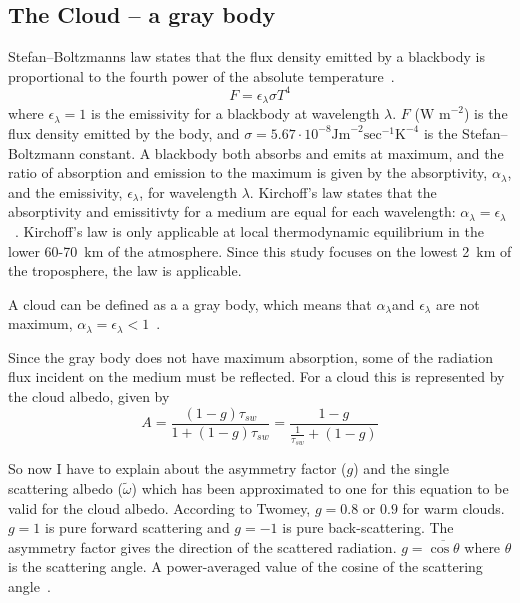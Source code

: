\subsection{The Cloud -- a gray body}
Stefan–Boltzmanns law states that the flux density emitted by a blackbody is proportional to the fourth power of the absolute temperature~\citep{Liou2002}. 
\begin{equation}
F = \epsilon_{\lambda} \sigma T^4
\label{eqn:stefanboltzmann}
\end{equation}
where $\epsilon_{\lambda} = 1$ is the emissivity for a blackbody at wavelength $\lambda$. $F$ ($\text{W~m}^{-2}$) is the flux density emitted  by the body, and $\sigma = 5.67\cdot 10^{-8} \text{Jm}^{-2}\text{sec}^{-1}\text{K}^{-4}$ is the Stefan–Boltzmann constant. A blackbody both absorbs and emits at maximum, and the ratio of absorption and emission to the maximum is given by the absorptivity, $\alpha_{\lambda}$, and the emissivity, $\epsilon_{\lambda}$, for wavelength $\lambda$. Kirchoff's law states that the absorptivity and emissitivty for a medium are equal for each wavelength: $\alpha_{\lambda} = \epsilon_{\lambda}$~\citep{Liou2002}. Kirchoff's law is only applicable at local thermodynamic equilibrium in the lower 60-70~km of the atmosphere. Since this study focuses on the lowest 2~km of the troposphere, the law is applicable.

A cloud can be defined as a a gray body, which means that $\alpha_{\lambda}$and $\epsilon_{\lambda}$ are not maximum, $\alpha_{\lambda}=\epsilon_{\lambda}<1$~\citep{Liou2002}. 

Since the gray body does not have maximum absorption, some of the radiation flux incident on the medium must be reflected. For a cloud this is represented by the cloud albedo, given by~\citep{Hobbs1993}
\begin{equation}
A = \frac{(1-g)\tau_{sw}}{1+(1-g)\tau_{sw}} = \frac{1-g}{\frac{1}{\tau_{sw}}+(1-g)}
\label{eqn:cloudalbedo_theory}
\end{equation}

So now I have to explain about the asymmetry factor ($g$) and the single scattering albedo ($\tilde{\omega}$) which has been approximated to one for this equation to be valid for the cloud albedo. According to Twomey, $g=0.8$ or $0.9$ for warm clouds. $g=1$ is pure forward scattering and $g=-1$ is pure back-scattering. The asymmetry factor gives the direction of the scattered radiation. $g=\overline{\cos \theta}$ where $\theta$ is the scattering angle. A power-averaged value of the cosine of the scattering angle~\citep{Twomey1974}.

